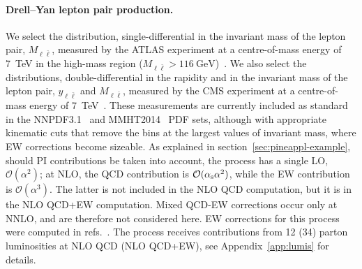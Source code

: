 \paragraph{Drell--Yan lepton pair production.}
We select the distribution, single-differential in the invariant mass of the
lepton pair, $M_{\ell \bar\ell}$, measured by the ATLAS experiment at a centre-of-mass
energy of \SI{7}{\tera\electronvolt} in the high-mass region
($M_{\ell\bar\ell}>\SI{116}{\giga\electronvolt}$)~\cite{Aad:2013iua}.
We also select the distributions, double-differential in the rapidity and in
the invariant mass of the lepton pair, $y_{\ell\bar\ell}$ and $M_{\ell\bar\ell}$,
measured by the CMS experiment at a centre-of-mass energy of
\SI{7}{\tera\electronvolt}~\cite{Chatrchyan:2013tia}.
These measurements are currently included as standard in the
NNPDF3.1~\cite{Ball:2017nwa} and MMHT2014~\cite{Harland-Lang:2014zoa} PDF sets,
although with appropriate kinematic cuts that remove the bins at the largest
values of invariant mass, where EW corrections become sizeable. As explained in
section~\ref{sec:pineappl-example}, should PI contributions be taken into account,
the process has a single LO, $\mathcal{O}(\alpha^2)$; at NLO, the
QCD contribution is $\mathcal{O}(\alpha_\mathrm{s}\alpha^2)$, while the EW contribution
is $\mathcal{O}(\alpha^3)$. The latter is not included in the NLO
QCD computation, but it is in the NLO QCD+EW computation. Mixed QCD-EW
corrections occur only at NNLO, and are therefore not considered here.
EW corrections for this process were computed in
refs.~\cite{Baur:2001ze,Dittmaier:2009cr}. The process receives contributions
from 12 (34) parton luminosities at NLO QCD (NLO QCD+EW),
see Appendix~\ref{app:lumis} for details.

